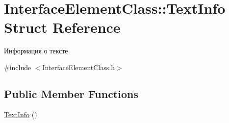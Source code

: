 \hypertarget{struct_interface_element_class_1_1_text_info}{}\section{Interface\+Element\+Class\+:\+:Text\+Info Struct Reference}
\label{struct_interface_element_class_1_1_text_info}


Информация о тексте  




{\ttfamily \#include $<$Interface\+Element\+Class.\+h$>$}

\subsection*{Public Member Functions}
\begin{DoxyCompactItemize}
\item 
\hyperlink{struct_interface_element_class_1_1_text_info_a31a64ef1013e2b15c2c58e5e8f98f4e3}{Text\+Info} ()
\end{DoxyCompactItemize}
